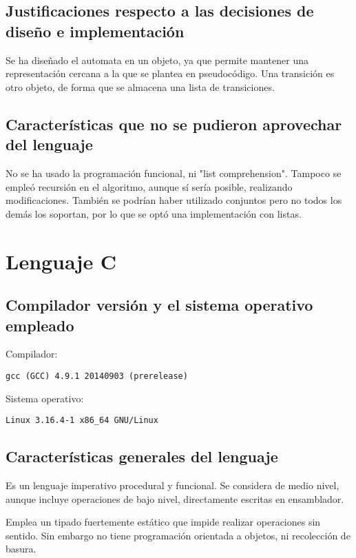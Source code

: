 \documentclass[12pt,a4paper]{article}
\begin{document}
\subsection{Justificaciones respecto a las decisiones de diseño e 
implementación}
Se ha diseñado el automata en un objeto, ya que permite mantener una
representación cercana a la que se plantea en pseudocódigo. Una transición es 
otro objeto, de forma que se almacena una lista de transiciones.


\subsection{Características que no se pudieron aprovechar del lenguaje}
No se ha usado la programación funcional, ni "list comprehension". Tampoco se 
empleó recursión en el algoritmo, aunque sí sería posible, realizando 
modificaciones. También se podrían haber utilizado conjuntos pero no todos los 
demás los soportan, por lo que se optó una implementación con listas.




\section{Lenguaje C}

\subsection{Compilador versión y el sistema operativo empleado}
Compilador:
\begin{lstlisting}
gcc (GCC) 4.9.1 20140903 (prerelease)
\end{lstlisting}
Sistema operativo:
\begin{lstlisting}
Linux 3.16.4-1 x86_64 GNU/Linux
\end{lstlisting}


\subsection{Características generales del lenguaje}
Es un lenguaje imperativo procedural y funcional. Se considera de medio nivel,
aunque incluye operaciones de bajo nivel, directamente escritas en ensamblador.

Emplea un tipado fuertemente estático que impide realizar operaciones sin
sentido. Sin embargo no tiene programación orientada a objetos, ni recolección
de basura.
\end{document}
